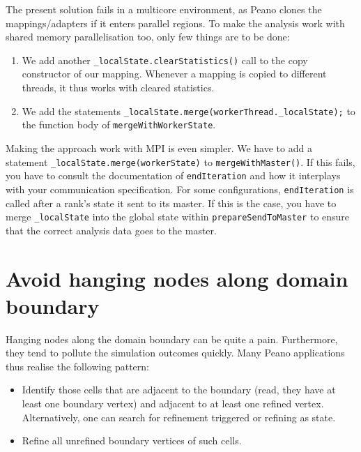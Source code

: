 The present solution fails in a multicore environment, as Peano clones the
mappings/adapters if it enters parallel regions. To make the analysis work with
shared memory parallelisation too, only few things are to be done:
\begin{enumerate}
  \item We add another \texttt{\_localState.clearStatistics()} call to the copy
  constructor of our mapping. Whenever a mapping is copied to different threads,
  it thus works with cleared statistics.
  \item We add the statements
  \texttt{\_localState.merge(workerThread.\_localState);} to the function body
  of \texttt{mergeWithWorkerState}.
\end{enumerate}


Making the approach work with MPI is even simpler. We have to add a statement
\linebreak
\texttt{\_localState.merge(workerState)}
to \texttt{mergeWithMaster()}. If this fails, you have to consult the
documentation of \texttt{endIteration} and how it interplays with your
communication specification. For some configurations, \texttt{endIteration} is
called after a rank's state it sent to its master. If this is the case, you have
to merge \texttt{\_localState} into the global state within
\texttt{prepareSendToMaster} to ensure that the correct analysis data goes to
the master.



\section{Avoid hanging nodes along domain boundary}

Hanging nodes along the domain boundary can be quite a pain. 
Furthermore, they tend to pollute the simulation outcomes quickly. 
Many Peano applications thus realise the following pattern:

\begin{itemize}
  \item Identify those cells that are adjacent to the boundary (read, they have
  at least one boundary vertex) and adjacent to at least one refined vertex.
  Alternatively, one can search for refinement triggered or refining as state.
  \item Refine all unrefined boundary vertices of such cells.
\end{itemize}

